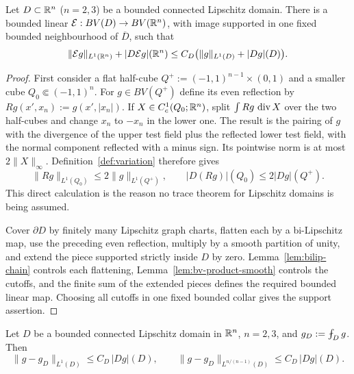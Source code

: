\begin{lemma}[BV extension]\label{lem:bv-extension}
Let $D\subset\mathbb R^n$ ($n=2,3$) be a bounded connected Lipschitz domain.  There
is a bounded linear $\mathcal E:BV(D)\to BV(\mathbb R^n)$, with image supported in
one fixed bounded neighbourhood of $\overline D$, such that
\begin{equation}\label{eq:bv-extension}
  \|\mathcal Eg\|_{L^1(\mathbb R^n)}+|D\mathcal Eg|(\mathbb R^n)
  \le C_D\bigl(\|g\|_{L^1(D)}+|Dg|(D)\bigr).
\end{equation}
\end{lemma}

\begin{proof}
First consider a flat half-cube
$Q^+:=(-1,1)^{n-1}\times(0,1)$ and a smaller cube $Q_0\Subset(-1,1)^n$.
For $g\in BV(Q^+)$ define its even reflection by
$Rg(x',x_n):=g(x',|x_n|)$.  If
$X\in C_c^1(Q_0;\mathbb R^n)$, split
$\int Rg\,\operatorname{div} X$ over the two half-cubes and change $x_n$ to $-x_n$ in the
lower one.  The result is the pairing of $g$ with the divergence of the
upper test field plus the reflected lower test field, with the normal
component reflected with a minus sign.  Its pointwise norm is at most
$2\|X\|_\infty$.  Definition~\ref{def:variation} therefore gives
\[
 \|Rg\|_{L^1(Q_0)}\le2\|g\|_{L^1(Q^+)},\qquad
 |D(Rg)|(Q_0)\le2|Dg|(Q^+).
\]
This direct calculation is the reason no trace theorem for Lipschitz domains
is being assumed.

Cover $\partial D$ by finitely many Lipschitz graph charts, flatten each by a
bi-Lipschitz map, use the preceding even reflection, multiply by a smooth
partition of unity, and extend the piece supported strictly inside $D$ by
zero.  Lemma~\ref{lem:bilip-chain} controls each flattening,
Lemma~\ref{lem:bv-product-smooth} controls the cutoffs, and the finite sum of
the extended pieces defines the required bounded linear map.  Choosing all
cutoffs in one fixed bounded collar gives the support assertion.
\end{proof}

\begin{theorem}[BV--Poincar\'e]\label{thm:bv-poincare}
Let $D$ be a bounded connected Lipschitz domain in $\mathbb R^n$, $n=2,3$, and
$g_D:=\avg_Dg$.  Then
\begin{equation}\label{eq:bv-poincare}
  \|g-g_D\|_{L^1(D)}\le C_D\,|Dg|(D),
  \qquad
  \|g-g_D\|_{L^{n/(n-1)}(D)}\le C_D\,|Dg|(D).
\end{equation}
\end{theorem}

